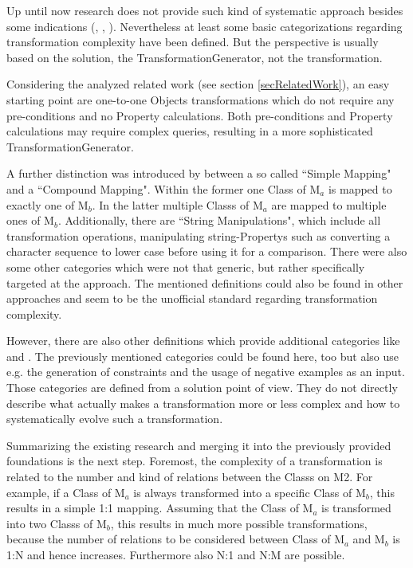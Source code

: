 Up until now research does not provide such kind of systematic approach besides some indications (\cite{Strommer2007}, \cite{IvanGarcia-Magarino2009}, \cite{Patzina}). Nevertheless at least some basic categorizations regarding transformation complexity have been defined. But the perspective is usually based on the solution, the \gls{TransformationGenerator}, not the transformation.

Considering the analyzed related work (see section \ref{secRelatedWork}), an easy starting point are one-to-one \glspl{Object} transformations which do not require any pre-conditions and no \gls{Property} calculations. Both pre-conditions and \gls{Property} calculations may require complex queries, resulting in a more sophisticated \gls{TransformationGenerator}.

A further distinction was introduced by \cite{Strommer2007} between a so called ``Simple Mapping" and a ``Compound Mapping". Within the former one \gls{Class} of M$_a$ is mapped to exactly one of M$_b$. In the latter multiple \glspl{Class} of M$_a$ are mapped to multiple ones of M$_b$. Additionally, there are ``String Manipulations", which include all transformation operations, manipulating string-\glspl{Property} such as converting a character sequence to lower case before using it for a comparison. There were also some other categories which were not that generic, but rather specifically targeted at the approach. The mentioned definitions could also be found in other approaches and seem to be the unofficial standard regarding transformation complexity.

However, there are also other definitions which provide additional categories like \cite{IvanGarcia-Magarino2009} and \cite{Patzina}. The previously mentioned categories could be found here, too but also use e.g. the generation of constraints and the usage of negative examples as an input. Those categories are defined from a solution point of view. They do not directly describe what actually makes a transformation more or less complex and how to systematically evolve such a transformation.

Summarizing the existing research and merging it into the previously provided foundations is the next step. Foremost, the complexity of a transformation is related to the number and kind of relations between the \glspl{Class} on M2. For example, if a \gls{Class} of M$_a$ is always transformed into a specific \gls{Class} of M$_b$, this results in a simple 1:1 mapping. Assuming that the \gls{Class} of M$_a$ is transformed into two \glspl{Class} of M$_b$, this results in much more possible transformations, because the number of relations to be considered between \gls{Class} of M$_a$ and M$_b$ is 1:N and hence increases. Furthermore also N:1 and N:M are possible.


